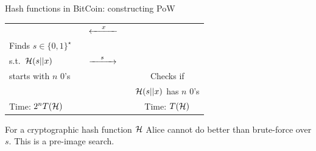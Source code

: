 \documentclass[usenames,dvipsnames, 9pt]{beamer}
\begin{document}
\begin{frame}{Hash functions in BitCoin: constructing PoW}
\begin{center}
\begin{tabular}{l c c c c}
		&  & \Huge $\xleftarrow{\mkern25mu x \mkern25mu}$ & &  \\ 
		Finds $s \in \{0,1\}^\star$   & & &  &  \\[-4pt]
		s.t.\ $\mathcal{H}(s||x)$ & & \Huge $\xrightarrow{\mkern25mu s \mkern25mu}$  &  &  \\
		starts with $n$ 0's & & &  &  Checks if \\
		  & & &  & $\mathcal{H}(s||x)$  has $n$ 0's\\
		{\color{Orange}  Time: $2^n T(\mathcal{H}) $} & & &  &  {\color{Orange}  Time: $T(\mathcal{H}) $}
	\end{tabular}
\end{center}

For a cryptographic hash function $\mathcal{H}$ Alice cannot do better than brute-force over $s$. This is a pre-image search. 
\end{frame}
\end{document}
